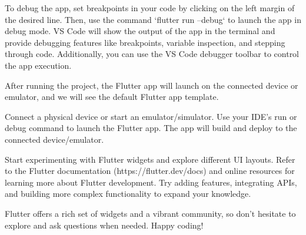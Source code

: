 To debug the app, set breakpoints in your code by clicking on the left margin of the desired line. 
Then, use the command `flutter run --debug` to launch the app in debug mode. VS Code will show the output of the app 
in the terminal and provide debugging features like breakpoints, variable inspection, and stepping through code. 
Additionally, you can use the VS Code debugger toolbar to control the app execution.

After running the project, the Flutter app will launch on the connected device or emulator, and we will see the 
default Flutter app template.


Connect a physical device or start an emulator/simulator.
Use your IDE's run or debug command to launch the Flutter app.
The app will build and deploy to the connected device/emulator.

Start experimenting with Flutter widgets and explore different UI layouts.
Refer to the Flutter documentation (https://flutter.dev/docs) and online resources for learning more about Flutter 
development. Try adding features, integrating APIs, and building more complex functionality to expand your knowledge.

Flutter offers a rich set of widgets and a vibrant community, so don't hesitate to explore and ask questions when 
needed. Happy coding!